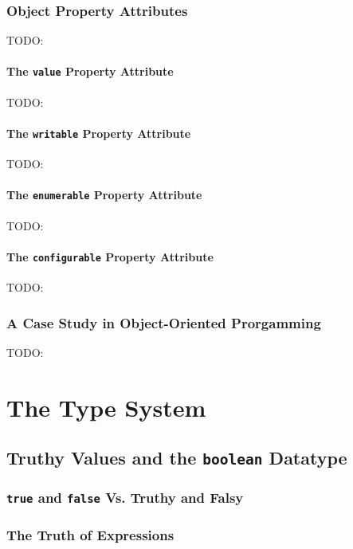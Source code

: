 \documentclass[11pt,letter]{book}
\begin{document}
    \section{Object Property Attributes}
    TODO:
    
    \subsection{The \texttt{value} Property Attribute}
    TODO:
    
    \subsection{The \texttt{writable} Property Attribute}
    TODO:
    
    \subsection{The \texttt{enumerable} Property Attribute}
    TODO:
    
    \subsection{The \texttt{configurable} Property Attribute}
    TODO:
    
    \section{A Case Study in Object-Oriented Prorgamming}
    TODO:
    
    \part{The Type System}
    
    \chapter{Truthy Values and the \texttt{boolean} Datatype}
    
    \section{\texttt{true} and \texttt{false} Vs. Truthy and Falsy}
    
    \section{The Truth of Expressions}
    
\end{document}
